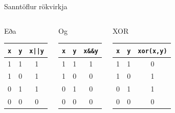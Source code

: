 \documentclass{beamer}
\begin{document}
\begin{frame}{Sanntöflur rökvirkja}
\begin{columns}
\begin{center}
Eða\\
\begin{tabular}{ccc}
\toprule
\texttt{x}&\texttt{y}&\texttt{x||y}\\
\midrule
1&1&1\\
1&0&1\\
0&1&1\\
0&0&0\\
\bottomrule
\end{tabular}
\end{center}
\begin{center}
Og\\
\begin{tabular}{ccc}
\toprule
\texttt{x}&\texttt{y}&\texttt{x\&\&y}\\
\midrule
1&1&1\\
1&0&0\\
0&1&0\\
0&0&0\\
\bottomrule
\end{tabular}
\end{center}
\begin{center}
XOR\\
\begin{tabular}{ccc}
\toprule
\texttt{x}&\texttt{y}&\texttt{xor(x,y)}\\
\midrule
1&1&0\\
1&0&1\\
0&1&1\\
0&0&0\\
\bottomrule
\end{tabular}
\end{center}
\end{columns}
\end{frame}
\end{document}
